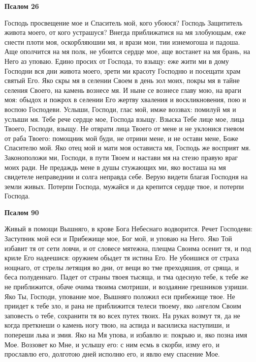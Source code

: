 \medskip\bfseries Псалом 26\normalfont{}\nopagebreak


Господь просвещение мое и Спаситель мой, кого убоюся? Господь Защититель живота моего, от кого устрашуся? Внегда приближатися на мя злобующым, еже снести плоти моя, оскорбляюшии мя, и врази мои, тии изнемогоша и падоша. Аще ополчится на мя полк, не убоится сердце мое, аще востанет на мя брань, на Него аз уповаю. Едино просих от Господа, то взыщу: еже жити ми в дому Господни вся дни живота моего, зрети ми красоту Господню и посещати храм святый Его. Яко скры мя в селении Своем в день зол моих, покры мя в тайне селения Своего, на камень вознесе мя. И ныне се вознесе главу мою, на враги моя: обыдох и пожрох в селении Его жертву хваления и воскликновения, пою и воспою Господеви. Услыши, Господи, глас мой, имже воззвах: помилуй мя и услыши мя. Тебе рече сердце мое, Господа взыщу. Взыска Тебе лице мое, лица Твоего, Господи, взыщу. Не отврати лица Твоего от мене и не уклонися гневом от раба Твоего: помощник мой буди, не отрини мене, и не остави мене, Боже Спасителю мой. Яко отец мой и мати моя остависта мя, Господь же восприят мя. Законоположи ми, Господи, в пути Твоем и настави мя на стезю правую враг моих ради. Не предаждь мене в душы стужающих ми, яко восташа на мя свидетеле неправеднии и солга неправда себе. Верую видети благая Господня на земли живых. Потерпи Господа, мужайся и да крепится сердце твое, и потерпи Господа.


\medskip\bfseries Псалом 90\normalfont{}\nopagebreak


Живый в помощи Вышняго, в крове Бога Небеснаго водворится. Речет Господеви: Заступник мой еси и Прибежище мое, Бог мой, и уповаю на Него. Яко Той избавит тя от сети ловчи, и от словесе мятежна, плещма Своима осенит тя, и под криле Его надеешися: оружием обыдет тя истина Его. Не убоишися от страха нощнаго, от стрелы летящия во дни, от вещи во тме преходяшия, от сряща, и беса полуденнаго. Падет от страны твоея тысяща, и тма одесную тебе, к тебе же не приближится, обаче очима твоима смотриши, и воздаяние грешников узриши. Яко Ты, Господи, упование мое, Вышняго положил еси прибежище твое. Не приидет к тебе зло, и рана не приближится телеси твоему, яко aнгелом Своим заповесть о тебе, сохранити тя во всех путех твоих. На руках возмут тя, да не когда преткнеши о камень ногу твою, на аспида и василиска наступиши, и попереши льва и змия. Яко на Мя упова, и избавлю и: покрыю и, яко позна имя Мое. Воззовет ко Мне, и услышу его: с ним есмь в скорби, изму его, и прославлю его, долготою дней исполню его, и явлю ему спасение Мое.


